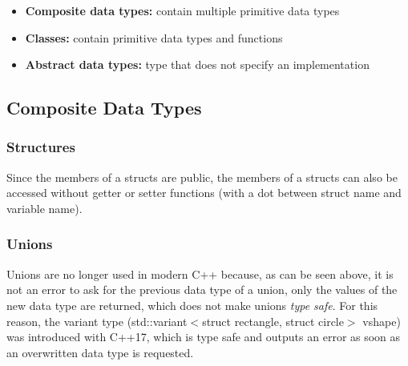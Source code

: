

\begin{itemize}
    \item \textbf{Composite data types:} contain multiple primitive data types
    \item \textbf{Classes:} contain primitive data types and functions
    \item \textbf{Abstract data types:} type that does not specify an implementation
\end{itemize}


\subsection{Composite Data Types}

\subsubsection{Structures}


Since the members of a structs are public, the members of a structs can also be accessed without getter or setter functions (with a dot between struct name and variable name).



\subsubsection{Unions}




Unions are no longer used in modern C++ because, as can be seen above, it is not an error to ask for the previous data type of a union, only the values of the new data type are returned, which does not make unions \emph{type safe}. For this reason, the variant type (std::variant$<$struct rectangle, struct circle$>$ vshape) was introduced with C++17, which is type safe and outputs an error as soon as an overwritten data type is requested. 

